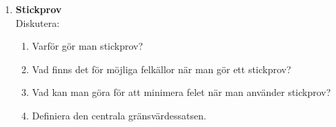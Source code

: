 \documentclass[a4paper,10pt]{article}
\begin{document}
\begin{enumerate}
\begin{enumerate}
    \end{enumerate}
    \newpage
    \item{{\bf Stickprov} \\ Diskutera:}
    \begin{enumerate}
        \item{Varför gör man stickprov?}
        \vspace{5cm}
        \item{Vad finns det för möjliga felkällor när man gör ett stickprov?}
        \vspace{5cm}
        \item{Vad kan man göra för att minimera felet när man använder stickprov?}
        \vspace{5cm}
        \item{Definiera den centrala gränsvärdessatsen.}
    \end{enumerate}
\end{enumerate}
\end{document}
